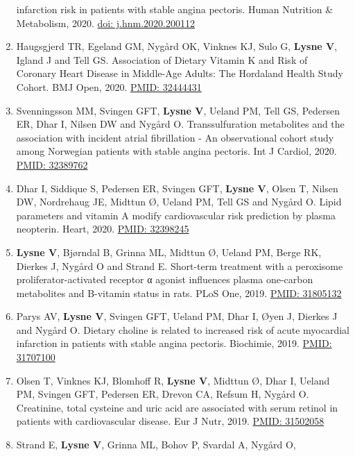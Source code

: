 \documentclass[11pt, a4paper]{awesome-cv}
\begin{document}
\begin{enumerate}
  infarction risk in patients with stable angina pectoris. Human
  Nutrition \& Metabolism, 2020.
  \href{https://www.sciencedirect.com/science/article/pii/S2666149720300025}{doi:
  j.hnm.2020.200112}
\item
  Haugsgjerd TR, Egeland GM, Nygård OK, Vinknes KJ, Sulo G,
  \textbf{Lysne V}, Igland J and Tell GS. Association of Dietary Vitamin
  K and Risk of Coronary Heart Disease in Middle-Age Adults: The
  Hordaland Health Study Cohort. BMJ Open, 2020.
  \href{https://pubmed.ncbi.nlm.nih.gov/32444431}{PMID: 32444431}
\item
  Svenningsson MM, Svingen GFT, \textbf{Lysne V}, Ueland PM, Tell GS,
  Pedersen ER, Dhar I, Nilsen DW and Nygård O. Transsulfuration
  metabolites and the association with incident atrial fibrillation - An
  observational cohort study among Norwegian patients with stable angina
  pectoris. Int J Cardiol, 2020.
  \href{https://www.ncbi.nlm.nih.gov/pubmed/32389762}{PMID: 32389762}
\item
  Dhar I, Siddique S, Pedersen ER, Svingen GFT, \textbf{Lysne V}, Olsen
  T, Nilsen DW, Nordrehaug JE, Midttun Ø, Ueland PM, Tell GS and Nygård
  O. Lipid parameters and vitamin A modify cardiovascular risk
  prediction by plasma neopterin. Heart, 2020.
  \href{https://pubmed.ncbi.nlm.nih.gov/32398245/}{PMID: 32398245}
\item
  \textbf{Lysne V}, Bjørndal B, Grinna ML, Midttun Ø, Ueland PM, Berge
  RK, Dierkes J, Nygård O and Strand E. Short-term treatment with a
  peroxisome proliferator-activated receptor α agonist influences plasma
  one-carbon metabolites and B-vitamin status in rats. PLoS One, 2019.
  \href{https://www.ncbi.nlm.nih.gov/pubmed/31805132}{PMID: 31805132}
\item
  Parys AV, \textbf{Lysne V}, Svingen GFT, Ueland PM, Dhar I, Øyen J,
  Dierkes J and Nygård O. Dietary choline is related to increased risk
  of acute myocardial infarction in patients with stable angina
  pectoris. Biochimie, 2019.
  \href{https://www.ncbi.nlm.nih.gov/pubmed/31707100}{PMID: 31707100}
\item
  Olsen T, Vinknes KJ, Blomhoff R, \textbf{Lysne V}, Midttun Ø, Dhar I,
  Ueland PM, Svingen GFT, Pedersen ER, Drevon CA, Refsum H, Nygård O.
  Creatinine, total cysteine and uric acid are associated with serum
  retinol in patients with cardiovascular disease. Eur J Nutr, 2019.
  \href{https://www.ncbi.nlm.nih.gov/pubmed/31502058}{PMID: 31502058}
\item
  Strand E, \textbf{Lysne V}, Grinna ML, Bohov P, Svardal A, Nygård O,

\end{enumerate}
\end{document}
